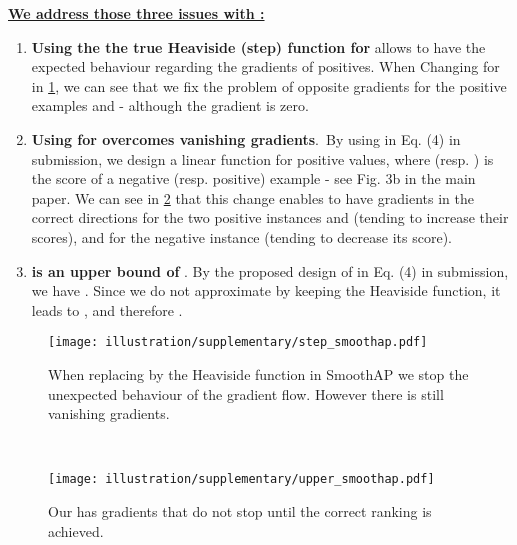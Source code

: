 \textbf{\underline{We address those three issues with :}}
\begin{enumerate}[i]
\item \textbf{Using the the true Heaviside (step) function  for } allows to have the expected behaviour regarding the gradients of positives. When Changing  for  in \cref{fig:step_smoothap_sup}, we can see that we fix the problem of opposite gradients for the positive examples  and  - although the gradient is zero.


\item \textbf{Using  for  overcomes vanishing gradients}.~By using  in Eq. (4) in submission, we design a linear function for positive  values, where  (resp. ) is the score of a negative (resp. positive) example - see Fig. 3b in the main paper. We can see in \cref{fig:upper_smoothap} that this change enables to have gradients in the correct directions for the two positive instances  and  (tending to increase their scores), and for the negative instance  (tending to decrease its score). 


\item \textbf{ is an upper bound of }. By the proposed design of  in Eq. (4) in submission, we have . Since we do not approximate  by keeping the Heaviside function, it leads to , and therefore .
\end{enumerate}





\begin{figure*}[t]
    \centering
    \begin{subfigure}[t]{0.47\textwidth}
        \centering
        \texttt{[image: illustration/supplementary/step\_smoothap.pdf]}
        \caption{When replacing  by the Heaviside function in SmoothAP we stop the unexpected behaviour of the gradient flow. However there is still vanishing gradients.}
        \label{fig:step_smoothap_sup}
    \end{subfigure}
    ~ 
    \begin{subfigure}[t]{0.47\textwidth}
        \centering
        \texttt{[image: illustration/supplementary/upper\_smoothap.pdf]}
        \caption{Our  has gradients that do not stop until the correct ranking is achieved.}
        \label{fig:upper_smoothap}
    \end{subfigure}
    \caption{We illustrates the different steps to built . On \cref{fig:step_smoothap_sup} we change  to be the true Heaviside (step) function. On \cref{fig:upper_smoothap} we replace the sigmoid by  defined in Eq. (4) of the main paper. Using  and ,  is an upper bound of .}
    \label{fig:introb_sup}
\end{figure*}

